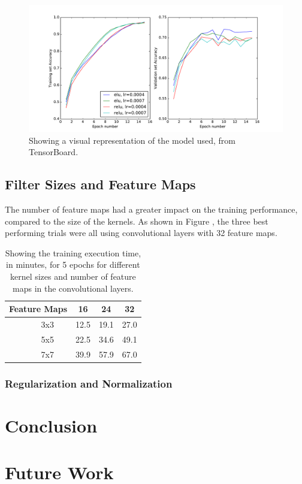 \documentclass[]{article}
\newcommand*\rot{\rotatebox{90}}
\begin{document}
\begin{figure}[h]
	\includegraphics[width=\textwidth]{ac_res}
	\caption{Showing a visual representation of the model used, from TensorBoard.}
	\label{ac_res}
	\centering
\end{figure}

\subsection{Filter Sizes and Feature Maps}

The number of feature maps had a greater impact on the training performance, compared to the size of the kernels. As shown in Figure , the three best performing trials were all using convolutional layers with 32 feature maps. 

\begin{table}[h]
	\centering
	\caption{Showing the training execution time, in minutes, for 5 epochs for different kernel sizes and number of feature maps in the convolutional layers.}
	\label{my-label}
	\begin{tabular}{@{}ccccc@{}}
		\toprule
		\multicolumn{2}{c}{Feature Maps} & 16 & 24 & 32 \\ \midrule
		\multirow{3}{*}{\rot{Size}} & \multicolumn{1}{c|}{3x3} & 12.5 & 19.1 & 27.0 \\
		& \multicolumn{1}{c|}{5x5} & 22.5 & 34.6 & 49.1 \\
		& \multicolumn{1}{c|}{7x7} & 39.9 & 57.9 & 67.0 \\ \bottomrule
	\end{tabular}
\end{table}



\subsubsection{Regularization and Normalization}

\section{Conclusion}

\section{Future Work}


\clearpage
\medskip


\end{document}
